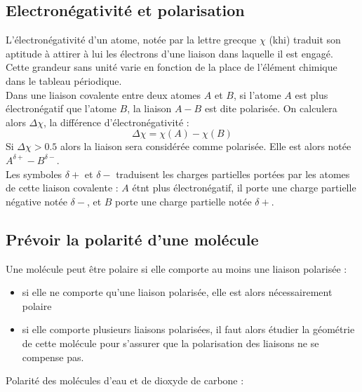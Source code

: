 \documentclass[a4paper,11pt,fleqn]{scrartcl}
\begin{document}
    \subsection{Electronégativité et polarisation}
    L'électronégativité d'un atome, notée par la lettre grecque $\chi$ (khi) traduit son aptitude à attirer à lui les électrons d'une liaison dans laquelle il est engagé. Cette grandeur sans unité varie en fonction de la place de l'élément chimique dans le tableau périodique.\\
    Dans une liaison covalente entre deux atomes $A$ et $B$, si l'atome $A$ est plus électronégatif que l'atome $B$, la liaison $A-B$ est dite polarisée. On calculera alors $\Delta \chi$, la différence d'électronégativité  : $$\Delta \chi = \chi(A) - \chi(B) $$
    Si $\Delta \chi >0.5$ alors la liaison sera considérée comme polarisée. Elle est alors notée $A^{\delta +} - B^{\delta -}$.\\
    Les symboles $\delta +$ et $\delta -$ traduisent les charges partielles portées par les atomes de cette liaison covalente : $A$ étnt plus électronégatif, il porte une charge partielle négative notée $\delta -$, et $B$ porte une charge partielle notée  $\delta +$.

    \subsection{Prévoir la polarité d'une molécule}
    Une molécule peut être polaire si elle comporte au moins une liaison polarisée :
    \begin{itemize}
        \item si elle ne comporte qu'une liaison polarisée, elle est alors nécessairement polaire
        \item si elle comporte plusieurs liaisons polarisées, il faut alors étudier la géométrie de cette molécule pour s'assurer que la polarisation des liaisons ne se compense pas.
    \end{itemize}
    \begin{exemple}
        Polarité des molécules d'eau et de dioxyde de carbone :\\
        \vspace{10em}
    \end{exemple}
\end{document}
